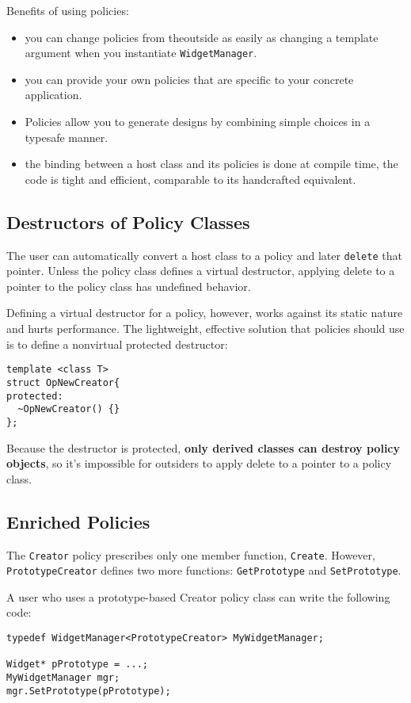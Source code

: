 Benefits of using policies:
\begin{itemize}
\item you can change policies from theoutside as easily as changing a
  template argument when you instantiate \texttt{WidgetManager}.
\item you can provide your own policies that are specific to your
  concrete application.
\item Policies allow you to generate designs by combining simple
  choices in a typesafe manner.
\item the binding between a host class and its policies is done at
  compile time, the code is tight and efficient, comparable to its
  handcrafted equivalent.
\end{itemize}

\subsection{Destructors of Policy Classes}

The user can automatically convert a host class to a policy and later
\texttt{delete} that pointer. Unless the policy class defines a virtual
destructor, applying delete to a pointer to the policy class has
undefined behavior.

Defining a virtual destructor for a policy, however, works against its
static nature and hurts performance. The lightweight, effective
solution that policies should use is to define a nonvirtual protected
destructor:
\begin{verbatim}
template <class T>
struct OpNewCreator{
protected:
  ~OpNewCreator() {}
};
\end{verbatim}

Because the destructor is protected, \textbf{only derived classes can destroy
policy objects}, so it's impossible for outsiders to apply delete to a
pointer to a policy class.

\subsection{Enriched Policies}

The \texttt{Creator} policy prescribes only one member function,
\texttt{Create}. However, \texttt{PrototypeCreator} defines two more functions:
\texttt{GetPrototype} and \texttt{SetPrototype}.

A user who uses a prototype-based Creator policy class can write the
following code: 
\begin{verbatim}
typedef WidgetManager<PrototypeCreator> MyWidgetManager;

Widget* pPrototype = ...;
MyWidgetManager mgr;
mgr.SetPrototype(pPrototype);
\end{verbatim}

